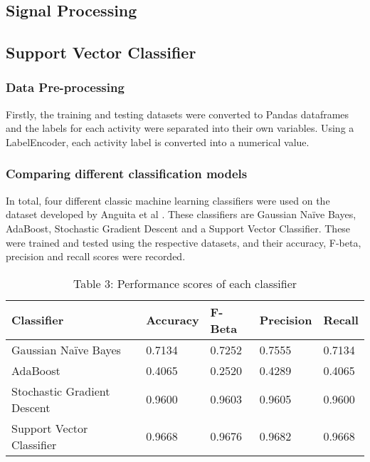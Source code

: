 \subsection{Signal Processing}

\subsection{Support Vector Classifier}
\subsubsection{Data Pre-processing}
    Firstly, the training and testing datasets were converted to Pandas dataframes and the labels for each activity were separated into their own variables.
    Using a LabelEncoder, each activity label is converted into a numerical value.

\subsubsection{Comparing different classification models}
    In total, four different classic machine learning classifiers were used on the dataset developed by Anguita et al \cite{Anguita2012}. These classifiers are Gaussian Naïve Bayes,
    AdaBoost, Stochastic Gradient Descent and a Support Vector Classifier. These were trained and tested using the respective datasets, and their accuracy,
    F-beta, precision and recall scores were recorded.

    \begin{table}[ht]
        \centering\footnotesize
        \begin{tabular}{|l|l|l|l|l|}
            \hline
            \textbf{Classifier} & \textbf{Accuracy} & \textbf{F-Beta}  & \textbf{Precision} & \textbf{Recall} \\ \hline
            Gaussian Naïve Bayes             & 0.7134           & 0.7252  & 0.7555 & 0.7134 \\ \hline
            AdaBoost            & 0.4065           & 0.2520 & 0.4289 & 0.4065 \\ \hline
            Stochastic Gradient Descent               & 0.9600           & 0.9603 & 0.9605 & 0.9600 \\ \hline
            Support Vector Classifier            & 0.9668           & 0.9676 & 0.9682 & 0.9668 \\ \hline
        \end{tabular}
        \caption*{Table 3: Performance scores of each classifier}
    \end{table}

